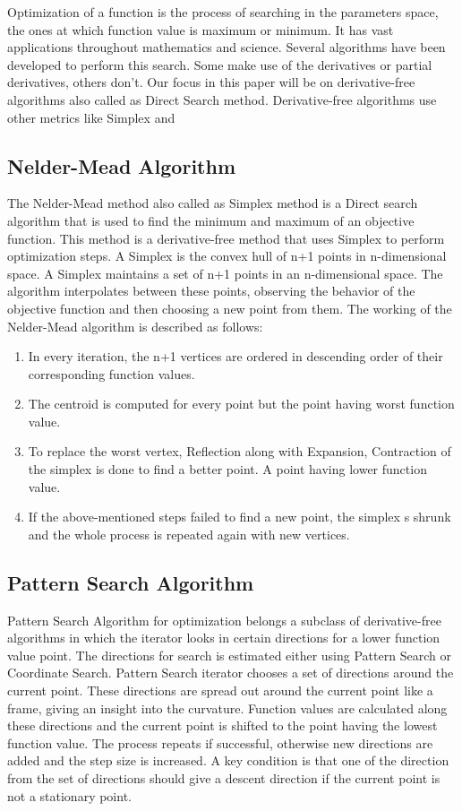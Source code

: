 Optimization of a function is the process of searching in the parameters space, the ones at which function value is maximum or minimum. It has vast applications throughout mathematics and science. Several algorithms have been developed to perform this search. Some make use of the derivatives or partial derivatives, others don't. Our focus in this paper will be on derivative-free algorithms also called as Direct Search method. Derivative-free algorithms use other metrics like Simplex and  
\subsection{Nelder-Mead Algorithm}
The Nelder-Mead method also called as Simplex method is a Direct search algorithm that is used to find the minimum and maximum of an objective function. This method is a derivative-free method that uses Simplex to perform optimization steps. A Simplex is the convex hull of n+1 points in n-dimensional space. A Simplex maintains a set of n+1 points in an n-dimensional space. The algorithm interpolates between these points, observing the behavior of the objective function and then choosing a new point from them. The working of the Nelder-Mead algorithm is described as follows:
\begin{enumerate}
     \item In every iteration, the n+1 vertices are ordered in descending order of their corresponding function values.
    \item The centroid is computed for every point but the point having worst function value.
    \item To replace the worst vertex, Reflection along with Expansion, Contraction of the simplex is done to find a better point. A point having lower function value. 
    \item If the above-mentioned steps failed to find a new point, the simplex s shrunk and the whole process is repeated again with new vertices.
\end{enumerate}

\subsection{Pattern Search Algorithm}
Pattern Search Algorithm for optimization belongs a subclass of derivative-free algorithms in which the iterator looks in certain directions for a lower function value point. The directions for search is estimated either using Pattern Search or Coordinate Search. Pattern Search iterator chooses a set of directions around the current point. These directions are spread out around the current point like a frame, giving an insight into the curvature. Function values are calculated along these directions and the current point is shifted to the point having the lowest function value. The process repeats if successful, otherwise new directions are added and the step size is increased. A key condition is that one of the direction from the set of directions should give a descent direction if the current point is not a stationary point. 


